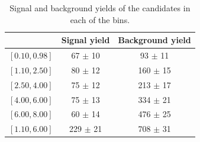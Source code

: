 \begin{table}[!htb]
\begin{center}
\begin{tabular}{lcc}
 & Signal yield & Background yield \\
\hline
$[0.10,0.98]$ & \hphantom{0}67 $\pm$ 10 & \hphantom{0}93 $\pm$ 11 \\
$[1.10,2.50]$ & \hphantom{0}80 $\pm$ 12 & 160 $\pm$ 15 \\
$[2.50,4.00]$ & \hphantom{0}75 $\pm$ 12 & 213 $\pm$ 17 \\
$[4.00,6.00]$ & \hphantom{0}75 $\pm$ 13 & 334 $\pm$ 21 \\
$[6.00,8.00]$ & \hphantom{0}60 $\pm$ 14 & 476 $\pm$ 25 \\
\hline
$[1.10,6.00]$ & 229 $\pm$ 21 & 708 $\pm$ 31 \\
\end{tabular}
\caption{Signal and background yields of the \BdToKpimm candidates in each of the \qsq bins.
\label{tab:massfit:yields}}
\end{center}
\end{table}